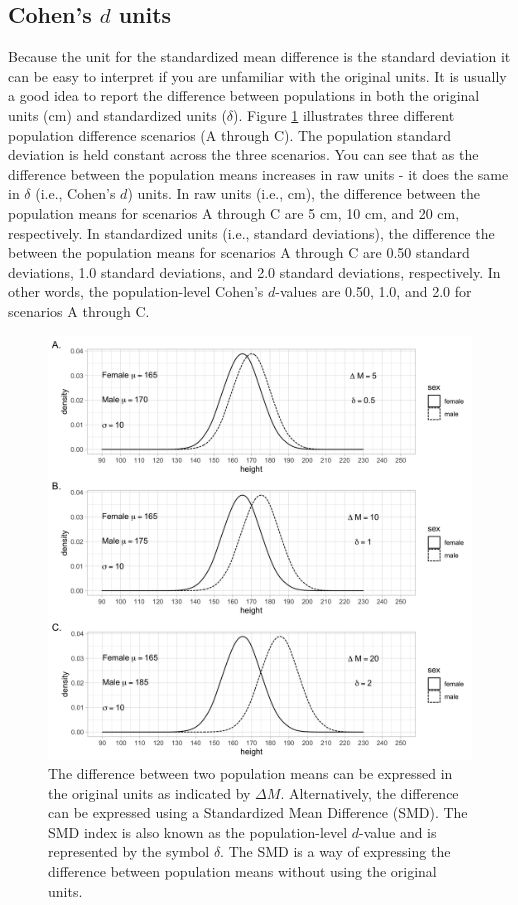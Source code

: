 \documentclass[
]{krantz}
\begin{document}
\hypertarget{cohens-d-units}{%
\subsection{\texorpdfstring{Cohen's \(d\) units}{Cohen's d units}}\label{cohens-d-units}}

Because the unit for the standardized mean difference is the standard deviation it can be easy to interpret if you are unfamiliar with the original units. It is usually a good idea to report the difference between populations in both the original units (cm) and standardized units (\(\delta\)). Figure \ref{fig:dex1} illustrates three different population difference scenarios (A through C). The population standard deviation is held constant across the three scenarios. You can see that as the difference between the population means increases in raw units - it does the same in \(\delta\) (i.e., Cohen's \(d\)) units. In raw units (i.e., cm), the difference between the population means for scenarios A through C are 5 cm, 10 cm, and 20 cm, respectively. In standardized units (i.e., standard deviations), the difference the between the population means for scenarios A through C are 0.50 standard deviations, 1.0 standard deviations, and 2.0 standard deviations, respectively. In other words, the population-level Cohen's \(d\)-values are 0.50, 1.0, and 2.0 for scenarios A through C.

\begin{figure}
\includegraphics[width=1\linewidth]{ch_populations/images/dvalue_ex1} \caption[Illustrating standardized mean difference]{The difference between two population means can be expressed in the original units as indicated by $\Delta M$. Alternatively, the difference can be expressed using a Standardized Mean Difference (SMD). The SMD index is also known as the population-level $d$-value and is represented by the symbol $\delta$. The SMD is a way of expressing the difference between population means without using the original units. }\label{fig:dex1}
\end{figure}
\end{document}

